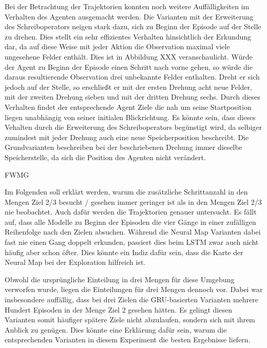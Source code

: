 Bei der Betrachtung der Trajektorien konnten noch weitere Auffälligkeiten im Verhalten des Agenten ausgemacht werden. Die Varianten mit der Erweiterung des Schreiboperators neigen stark dazu, sich zu Beginn der Episode auf der Stelle zu drehen. Dies stellt ein sehr effizientes Verhalten hinsichtlich der Erkundung dar, da auf diese Weise mit jeder Aktion die Observation maximal viele ungesehene Felder enthält. Dies ist in Abbildung XXX veranschaulicht. Würde der Agent zu Beginn der Episode einen Schritt nach vorne gehen, so würde die daraus resultierende Observation drei unbekannte Felder enthalten. Dreht er sich jedoch auf der Stelle, so erschließt er mit der ersten Drehung acht neue Felder, mit der zweiten Drehung sieben und mit der dritten Drehung sechs. Durch dieses Verhalten findet der entsprechende Agent Ziele die nah um seine Startposition liegen unabhängig von seiner initialen Blickrichtung. Es könnte sein, dass dieses Vehalten durch die Erweiterung des Schreiboperators begünstigt wird, da selbiger zumindest mit jeder Drehung auch eine neue Speicherposition beschreibt. Die Grundvarianten beschreiben bei der beschriebenen Drehung immer dieselbe Speicherstelle, da sich die Position des Agenten nicht verändert.



FWMG

Im Folgenden soll erklärt werden, warum die zusätzliche Schrittanzahl in den Mengen \glqq Ziel 2/3 besucht / gesehen\grqq{} immer geringer ist als in den Mengen \glqq Ziel 2/3 nie beobachtet\grqq{}. Auch dafür werden die Trajektorien genauer untersucht. Es fällt auf, dass alle Modelle zu Beginn der Episoden die vier Gänge in einer zufälligen Reihenfolge nach den Zielen absuchen. Während die Neural Map Varianten dabei fast nie einen Gang doppelt erkunden, passiert dies beim LSTM zwar auch nicht häufig aber schon öfter. Dies könnte ein Indiz dafür sein, dass die Karte der Neural Map bei der Exploration hilfreich ist.



Obwohl die ursprüngliche Einteilung in drei Mengen für diese Umgebung verworfen wurde, liegen die Einteilungen für drei Mengen dennoch vor. Dabei war insbesondere auffällig, dass bei drei Zielen die GRU-basierten Varianten mehrere Hundert Episoden in der Menge \glqq Ziel 2 gesehen\grqq{} hätten. Es gelingt diesen Varianten somit häufiger spätere Ziele nicht abzulaufen, sondern sich mit ihrem Anblick zu genügen. Dies könnte eine Erklärung dafür sein, warum die entsprechenden Varianten in diesem Experiment die besten Ergebnisse liefern.




